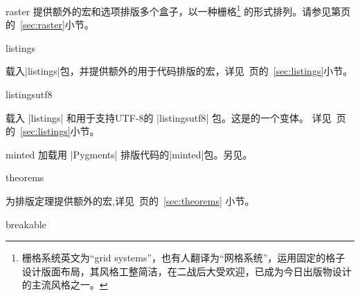 {\begin{docTcbKey}[library]{raster}{}{}
提供额外的宏和选项排版多个盒子，以一种栅格\footnote{栅格系统英文为“grid systems”，也有人翻译为“网格系统”，运用固定的格子设计版面布局，其风格工整简洁，在二战后大受欢迎，已成为今日出版物设计的主流风格之一。}%
的形式排列。请参见第\pageref{sec:raster}页的~\ref{sec:raster}小节。
\end{docTcbKey}

\begin{docTcbKey}[library]{listings}{}{}

  载入|listings|包，并提供额外的用于代码排版的宏，详见~\pageref{sec:listings}页的~\ref{sec:listings}小节。
\end{docTcbKey}

\begin{docTcbKey}[library]{listingsutf8}{}{}

载入 |listings| 和用于支持UTF-8的 |listingsutf8| 包。这是的一个变体。%
详见~\pageref{sec:listings}页的~\ref{sec:listings}小节。
\end{docTcbKey}



\begin{docTcbKey}[library]{minted}{}{}
加载用 |Pygments| %
排版代码的|minted|包。另见。
\end{docTcbKey}

\begin{docTcbKey}[library]{theorems}{}{}

  为排版定理提供额外的宏,详见~\pageref{sec:theorems}页的~\ref{sec:theorems} 小节。
\end{docTcbKey}


\begin{docTcbKey}[library]{breakable}{}{}


\end{docTcbKey}}
